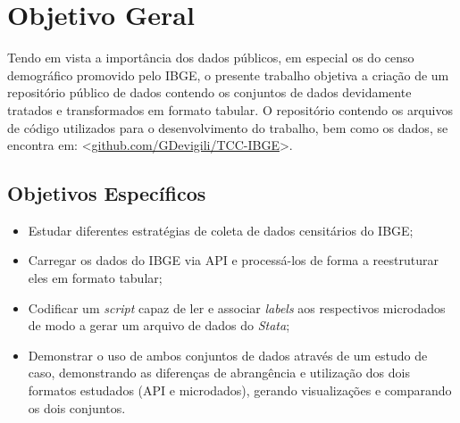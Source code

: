 


\chapter{Objetivo Geral}

    Tendo em vista a importância dos dados públicos, em especial os do censo demográfico promovido pelo IBGE, o presente trabalho objetiva a criação de um repositório público de dados contendo os conjuntos de dados devidamente tratados e transformados em formato tabular. O repositório contendo os arquivos de código utilizados para o desenvolvimento do trabalho, bem como os dados, se encontra em: <\url{github.com/GDevigili/TCC-IBGE}>.


\section{Objetivos Específicos}

\begin{itemize}
    \item Estudar diferentes estratégias de coleta de dados censitários do IBGE;
    \item Carregar os dados do IBGE via API e processá-los de forma a reestruturar eles em formato tabular;
    \item Codificar um \textit{script} capaz de ler e associar \textit{labels} aos respectivos microdados de modo a gerar um arquivo de dados do \textit{Stata};
    \item Demonstrar o uso de ambos conjuntos de dados através de um estudo de caso, demonstrando as diferenças de abrangência e utilização dos dois formatos estudados (API e microdados), gerando visualizações e comparando os dois conjuntos.
\end{itemize}